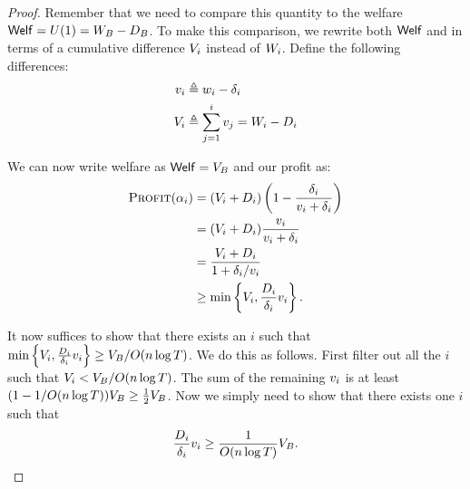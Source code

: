 \documentclass{article}
\def \Welf  {{\sf Welf}}
\newcommand{\Profit}{\textsc{Profit}}
\newcommand{\Utility}{U}
\begin{document}
\begin{proof}
Remember that we need to compare this quantity to the welfare $\Welf = \Utility(1) = \CumulativeCoefficientJump{B} - \CumulativeBiasDrop{B}$. To make this comparison, we rewrite both $\Welf$ and  in terms of a cumulative difference $V_{i}$ instead of $W_{i}$. Define the following differences:
\begin{align*}
  v_{i}           &\triangleq w_{i} - \delta_{i} \\
  V_{i} &\triangleq \sum_{j=1}^i v_{j} = W_{i} - D_{i}
\end{align*}

We can now write welfare as $\Welf = \CumulativeMagicDifference{B}$ and our profit as:
\begin{align*}
  \Profit(\Breakpoint{i})
    &= (\CumulativeMagicDifference{i} + \CumulativeBiasDrop{i}) \left( 1 - \frac{\BiasDrop{i}}{\MagicDifference{i} + \BiasDrop{i}} \right) \\
    &= (\CumulativeMagicDifference{i} + \CumulativeBiasDrop{i}) \frac{\MagicDifference{i}}{\MagicDifference{i} + \BiasDrop{i}} \\
    &= \frac{\CumulativeMagicDifference{i} + \CumulativeBiasDrop{i}}{1 + \BiasDrop{i} / \MagicDifference{i}} \\
    &\ge \min \left\{ \CumulativeMagicDifference{i}, \frac{\CumulativeBiasDrop{i}}{\BiasDrop{i}} \MagicDifference{i} \right\} \text{.}
\end{align*}

It now suffices to show that there exists an $i$ such that $\min \left\{ V_{i}, \frac{D_{i}}{\delta_{i}} v_{i} \right\} \geq V_{B} / O(n \log T)$. We do this as follows. First filter out all the $i$ such that $V_{i} < V_{B} / O(n \log T)$. The sum of the remaining $v_{i}$ is at least $(1 - 1/O(n \log T)) V_{B} \ge \tfrac12 V_{B}$. Now we simply need to show that there exists one $i$ such that
\begin{align*}
  \frac{D_{i}}{\delta_{i}} v_{i} \geq \frac{1}{O(n\log T)} V_{B}\text{.}
\end{align*}


\end{proof}
\end{document}
